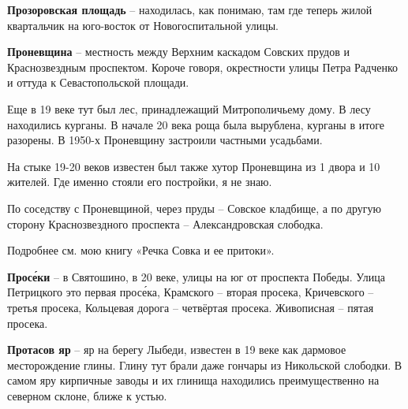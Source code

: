 \medskip


\textbf{Прозоровская площадь} – находилась, как понимаю, там где теперь жилой квартальчик на юго-восток от Новогоспитальной улицы.\\

\medskip


\textbf{Проневщина} – местность между Верхним каскадом Совских прудов и Краснозвездным проспектом. Короче говоря, окрестности улицы Петра Радченко и оттуда к Севастопольской площади.

Еще в 19 веке тут был лес, принадлежащий Митрополичьему дому. В лесу находились курганы. В начале 20 века роща была вырублена, курганы в итоге разорены. В 1950-х Проневщину застроили частными усадьбами.

На стыке 19-20 веков известен был также хутор Проневщина из 1 двора и 10 жителей. Где именно стояли его постройки, я не знаю.

По соседству с Проневщиной, через пруды – Совское кладбище, а по другую сторону Краснозвездного проспекта – Александровская слободка. 

Подробнее см. мою книгу «Речка Совка и ее притоки».\\

\medskip






\textbf{Прос\'еки} – в Святошино, в 20 веке, улицы на юг от проспекта Победы. Улица Петрицкого это первая прос\'ека, Крамского – вторая просека, Кричевского – третья просека, Кольцевая дорога – четвёртая просека. Живописная – пятая просека.\\

\medskip


\textbf{Протасов яр} – яр на берегу Лыбеди, известен в 19 веке как дармовое месторождение глины. Глину тут брали даже гончары из Никольской слободки. В самом яру кирпичные заводы и их глинища находились преимущественно на северном склоне, ближе к устью.

